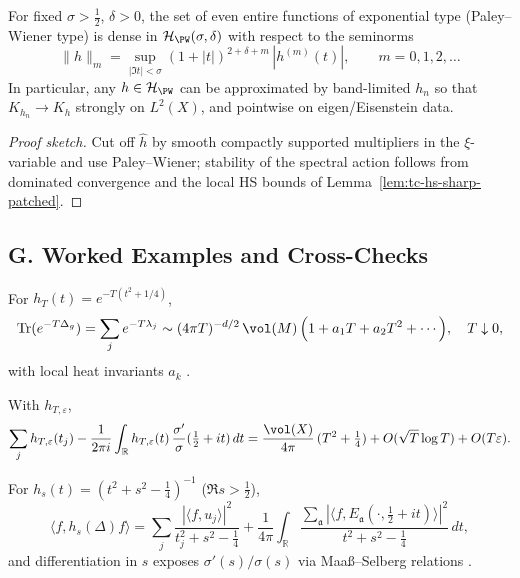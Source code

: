\begin{proposition}
\label{prop:density}
For fixed $\sigma>\tfrac12$, $\delta>0$, the set of even entire functions of exponential type (Paley–Wiener type) is dense in $\mathcal H_{\PW}(\sigma,\delta)$ with respect to the seminorms
\[
  \|h\|_{m}=\sup_{|\Im t|<\sigma}(1+|t|)^{2+\delta+m}\,|h^{(m)}(t)|,\qquad m=0,1,2,\dots
\]
In particular, any $h\in\mathcal H_{\PW}$ can be approximated by band-limited $h_n$ so that $K_{h_n}\to K_h$ strongly on $L^2(X)$, and pointwise on eigen/Eisenstein data.
\end{proposition}

\begin{proof}[Proof sketch]
Cut off $\hat h$ by smooth compactly supported multipliers in the $\xi$-variable and use Paley–Wiener; stability of the spectral action follows from dominated convergence and the local HS bounds of Lemma~\ref{lem:tc-hs-sharp-patched}.
\end{proof}


\subsection*{G. Worked Examples and Cross-Checks}
\label{subsec:examples-probes-sharp-patched}

\begin{example}
For $h_T(t)=e^{-T(t^2+1/4)}$,
\[
  \mathrm{Tr}(e^{-T\Delta_g})
  =\sum_j e^{-T\lambda_j}
  \sim (4\pi T)^{-d/2}\,\vol(M)\,\Big(1+a_1 T+a_2 T^2+\cdots\Big),\quad T\downarrow0,
\]
with local heat invariants $a_k$ \cite{Minakshisundaram1949,Seeley1967}.
\end{example}

\begin{example}
With $h_{T,\varepsilon}$,
\[
  \sum_j h_{T,\varepsilon}(t_j)-\frac{1}{2\pi i}\int_{\mathbb R} h_{T,\varepsilon}(t)\,\frac{\sigma'}{\sigma}(\tfrac12+it)\,dt
  =\frac{\vol(X)}{4\pi}\,(T^2+\tfrac14) + O(\sqrt{T}\log T)+O(T\varepsilon).
\]
\end{example}

\begin{example}
For $h_s(t)=(t^2+s^2-\tfrac14)^{-1}$ ($\Re s>\tfrac12$),
\[
  \langle f,h_s(\Delta)f\rangle
  =\sum_j \frac{|\langle f,u_j\rangle|^2}{t_j^2+s^2-\tfrac14}
   +\frac{1}{4\pi}\int_{\mathbb R}\frac{\sum_{\mathfrak a}|\langle f,E_{\mathfrak a}(\cdot,\tfrac12+it)\rangle|^2}{t^2+s^2-\tfrac14}\,dt,
\]
and differentiation in $s$ exposes $\sigma'(s)/\sigma(s)$ via Maaß–Selberg relations \cite{LaxPhillips1976,Hejhal1983II}.
\end{example}

